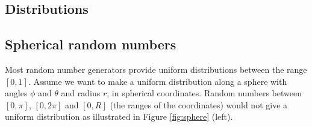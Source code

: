 \begin{appendices}

\chapter{Distributions}
\label{ch:distributions}

\section{Spherical random numbers}
\label{sec:sphericalrandom}
Most random number generators provide uniform distributions between the range $[0,1]$. Assume we want to make a uniform distribution along a sphere with angles $\phi$ and $\theta$ and radius $r$, in spherical coordinates. Random numbers between $[0,\pi]$, $[0,2\pi]$ and $[0,R]$ (the ranges of the coordinates) would not give a uniform distribution as illustrated in Figure \ref{fig:sphere} (left).


\end{appendices}
